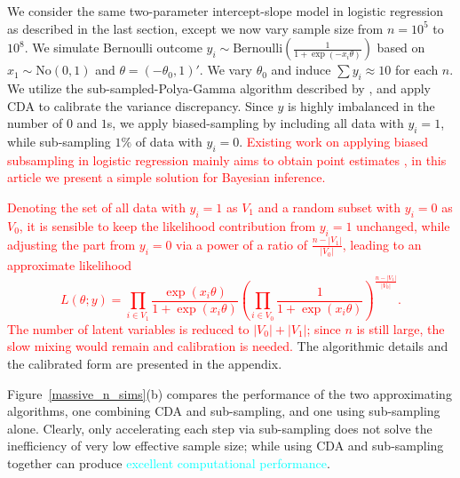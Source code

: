 \documentclass[11pt]{article}
\newcommand{\leo}[1]{{\textcolor{red}{#1}}}
\newcommand{\dave}[1]{{\textcolor{cyan}{#1}}}
\newcommand{\No}{\text{No}}
\newcommand{\Bern}{\text{Bernoulli}}
\begin{document}
We consider the same two-parameter intercept-slope model in logistic regression
as described in the last section, except we now vary sample size from  $n=10^5$ to $10^8$. We simulate Bernoulli outcome $y_i\sim \Bern(\frac{1}{1+\exp(-x_i\theta)})$ based on $x_1\sim \No(0,1)$ and $\theta=(-\theta_0,1)'$. We vary $\theta_0$ and induce $\sum{y_i}\approx
10$ for each $n$. We utilize the sub-sampled-Polya-Gamma algorithm described by \cite{johndrow2015approximations},
and apply CDA to calibrate the variance discrepancy. Since $y$ is highly imbalanced in
the number of $0$ and $1$s, we apply biased-sampling by including all data
with $y_i=1$, while sub-sampling $1\%$ of data with $y_i=0$. \leo{Existing work on applying biased subsampling in logistic regression mainly aims to obtain point estimates \citep{king2001logistic,wang2017optimal},
in this article we present a simple solution for Bayesian inference.}

\leo{Denoting the set of all data with $y_i=1$ as $V_1$ and a random subset  with $y_i=0$ as $V_0$, it is sensible to keep
the likelihood contribution from $y_i=1$ unchanged, while adjusting the part from $y_i=0$ via a power of a ratio of $\frac{n-|V_1|}{|V_0|}$, leading to an approximate likelihood
$$L(\theta;y) = \prod_{i\in V_1}\frac{\exp(x_i\theta)}{ 1+\exp(x_i\theta)}  (\prod_{i\in V_0}\frac{1}{ 1+\exp(x_i\theta)}
)^{\frac{n-|V_1|}{|V_0|}}.$$
The number of latent variables is reduced to $|V_0|+|V_1|$; since
$n$ is still large, the slow mixing would remain and calibration is needed.
} The algorithmic details and the calibrated form are presented in the appendix.


Figure~\ref{massive_n_sims}(b) compares the performance of the two approximating
algorithms, one  combining CDA and sub-sampling, and one  using sub-sampling alone. Clearly, only accelerating each step via sub-sampling  does not solve the inefficiency  of very low
effective sample size; while using CDA and  sub-sampling together can produce \dave{excellent computational performance}. 
\end{document}

